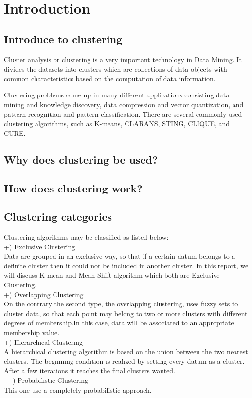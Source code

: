 \section{Introduction}
\subsection{Introduce to clustering}

\forceindent Cluster analysis or clustering is a very important technology in Data Mining. It divides the datasets into clusters which are collections of data objects with common characteristics based on the computation of data information.

Clustering problems come up in many different applications consisting data mining and knowledge discovery, data compression and vector quantization, and pattern recognition and pattern classification. There are several commonly used clustering algorithms, such as K-means, CLARANS, STING, CLIQUE, and CURE.  %


\subsection{Why does clustering be used?}

\subsection{How does clustering work?}

\subsection{Clustering categories}
Clustering algorithms may be classified as listed below:\\
+) Exclusive Clustering \\
Data are grouped in an exclusive way, so that if a certain datum belongs to a definite cluster then it could not be included in another cluster. In this report, we will discuss K-mean and Mean Shift algorithm which both are Exclusive Clustering.\\
+) Overlapping Clustering \\
On the contrary the second type, the overlapping clustering, uses fuzzy sets to cluster data, so that each point may belong to two or more clusters with different degrees of membership.In this case, data will be associated to an appropriate membership value.\\
 +) Hierarchical Clustering \\
A hierarchical clustering algorithm is based on the union between the two nearest clusters. The beginning condition is realized by setting every datum as a cluster. After a few iterations it reaches the final clusters wanted.\\\
 +) Probabilistic Clustering\\
This one use a completely probabilistic approach.
